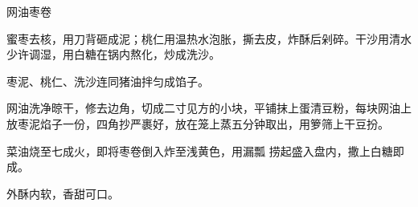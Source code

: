 \begin{recipe}{网油枣卷}

\ingredients


\cooking

\step 蜜枣去核，用刀背砸成泥；桃仁用温热水泡胀，撕去皮，炸酥后剁碎。干沙用清水
少许调湿，用白糖在锅内熬化，炒成洗沙。

\step 枣泥、桃仁、洗沙连同猪油拌匀成馅子。

\step 网油洗净晾干，修去边角，切成二寸见方的小块，平铺抹上蛋清豆粉，每块网油上
放枣泥焰子一份，四角抄严裹好，放在笼上蒸五分钟取出，用箩筛上干豆扮。

菜油烧至七成火，即将枣卷倒入炸至浅黄色，用漏瓢 捞起盛入盘内，撒上白糖即成。

\features

外酥内软，香甜可口。

\end{recipe}

